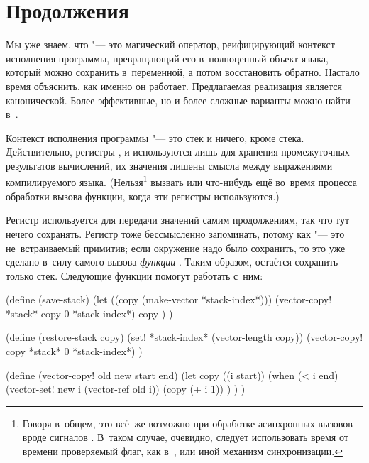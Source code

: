 \section{Продолжения}\label{compilation/sect:continue}

Мы уже знаем, что  "--- это магический оператор, реифицирующий
контекст исполнения программы, превращающий его в~полноценный объект языка,
который можно сохранить в~переменной, а потом восстановить обратно. Настало
время объяснить, как именно он работает. Предлагаемая реализация является
канонической. Более эффективные, но и более сложные варианты можно найти
в~\cite{cho88,hdb90,mb93}.

Контекст исполнения программы "--- это стек и ничего, кроме стека.
Действительно, регистры ,  и  используются лишь
для хранения промежуточных результатов вычислений, их значения лишены смысла
между выражениями компилируемого языка. (Нельзя\footnote{Говоря в~общем, это
всё~же возможно при обработке асинхронных вызовов вроде сигналов \UNIX. В~таком
случае, очевидно, следует использовать время от времени проверяемый флаг, как
в~\cite{dev85}, или иной механизм синхронизации.} вызвать  или
что-нибудь ещё во~время процесса обработки вызова функции, когда эти регистры
используются.)

Регистр  используется для передачи значений самим продолжениям, так
что тут нечего сохранять. Регистр  тоже бессмысленно запоминать,
потому как  "--- это не~встраиваемый примитив; если
окружение надо было сохранить, то это уже сделано в~силу самого вызова
\emph{функции} . Таким образом, остаётся сохранить только стек.
Следующие функции помогут работать с~ним:

\begin{code:lisp}
(define (save-stack)
  (let ((copy (make-vector *stack-index*)))
    (vector-copy! *stack* copy 0 *stack-index*)
    copy ) )

(define (restore-stack copy)
  (set! *stack-index* (vector-length copy))
  (vector-copy! copy *stack* 0 *stack-index*) )

(define (vector-copy! old new start end)
  (let copy ((i start))
    (when (< i end)
          (vector-set! new i (vector-ref old i))
          (copy (+ i 1)) ) ) )
\end{code:lisp}

